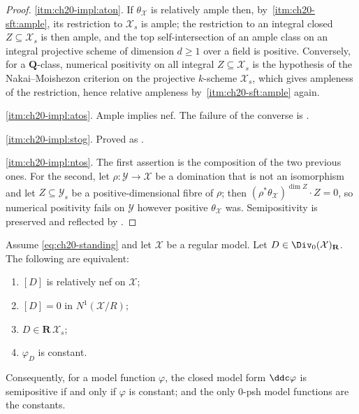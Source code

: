 \begin{proof}
\cref{itm:ch20-impl:aton}.  If \(\theta_{\mathcal X}\) is relatively ample
then, by
\,\cref{itm:ch20-sft:ample}, its
restriction to \(\mathcal X_s\) is ample; the restriction to an integral
closed \(Z\subseteq\mathcal X_s\) is then ample, and the top
self-intersection of an ample class on an integral projective scheme of
dimension \(d\geq1\) over a field is positive.  Conversely, for a
\(\mathbf Q\)-class, numerical positivity on all integral
\(Z\subseteq\mathcal X_s\) is the hypothesis of the Nakai--Moishezon
criterion on the projective \(k\)-scheme \(\mathcal X_s\), which gives
ampleness of the restriction, hence relative ampleness by
\,\cref{itm:ch20-sft:ample} again.

\cref{itm:ch20-impl:atos}.  Ample implies nef.  The failure of the converse
is .

\cref{itm:ch20-impl:stog}.  Proved as
.

\cref{itm:ch20-impl:ntos}.  The first assertion is the composition of the
two previous ones.  For the second, let \(\rho:\mathcal Y\to\mathcal X\) be
a domination that is not an isomorphism and let \(Z\subseteq\mathcal Y_s\)
be a positive-dimensional fibre of \(\rho\); then
\((\rho^*\theta_{\mathcal X})^{\dim Z}\cdot Z=0\), so numerical positivity
fails on \(\mathcal Y\) however positive \(\theta_{\mathcal X}\) was.
Semipositivity is preserved and reflected by
.
\end{proof}

\begin{theorem}
\label{thm:ch20-vertical-nef-rigidity}
Assume \eqref{eq:ch20-standing} and let \(\mathcal X\) be a regular model.
Let \(D\in\Div_0(\mathcal X)_{\mathbf R}\).  The following are equivalent:
\begin{enumerate}
\item\label{itm:ch20-rig:nef} \([D]\) is relatively nef on \(\mathcal X\);
\item\label{itm:ch20-rig:zero} \([D]=0\) in \(N^1(\mathcal X/R)\);
\item\label{itm:ch20-rig:prop} \(D\in\mathbf R\,\mathcal X_s\);
\item\label{itm:ch20-rig:const} \(\varphi_D\) is constant.
\end{enumerate}
Consequently, for a model function \(\varphi\), the closed model form
\(\ddc\varphi\) is semipositive if and only if \(\varphi\) is constant; and
the only \(0\)-psh model functions are the constants.
\end{theorem}

